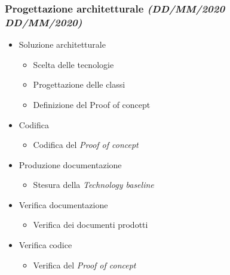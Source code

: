 \documentclass[../piano-di-progetto.tex]{subfiles}
\begin{document}
\subsubsection[Progettazione architetturale]{Progettazione architetturale {\normalsize\normalfont\itshape(DD/MM/2020  DD/MM/2020)}}%
\label{subs:progettazione_architetturale}
\begin{itemize}
  \item Soluzione architetturale
  \begin{itemize}
    \item Scelta delle tecnologie
    \item Progettazione delle classi
    \item Definizione del \textit{}{Proof of concept}
  \end{itemize}
  \item Codifica
  \begin{itemize}
    \item Codifica del \textit{Proof of concept}
  \end{itemize}
  \item Produzione documentazione
  \begin{itemize}
    \item Stesura della \textit{Technology baseline}
  \end{itemize}
  \item Verifica documentazione
  \begin{itemize}
    \item Verifica dei documenti prodotti
  \end{itemize}
  \item Verifica  codice 
  \begin{itemize}
    \item Verifica  del \textit{Proof of concept}
  \end{itemize}
\end{itemize}
\end{document}
